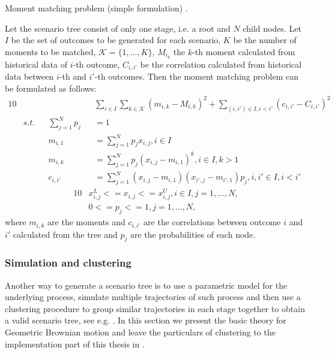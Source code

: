\begin{defn}{Moment matching problem (simple formulation) \cite[p. 9]{moment_matching_agarwal}.}

Let the scenario tree consist of only one stage, i.e. a root and $N$ child nodes. Let $I$ be the set of outcomes to be generated for each scenario, $K$ be the number of moments to be matched, $\mathcal{K}=\{1,\dots,K\}$, $M_{i_k}$ the $k$-th moment calculated from historical data of $i$-th outcome, $C_{i,i'}$ be the correlation calculated from historical data between $i$-th and $i'$-th outcomes. Then the moment matching problem can be formulated as follows:
\begin{alignat}{10}
& && && \sum_{i\in I} \sum_{k\in \mathcal{K}} \left(m_{i,k} - M_{i,k}\right)^2 + \sum_{(i, i') \in I, i < i'}(c_{i,i'}-C_{i,i'})^2 \nonumber \\
& s.t. && \sum_{j=1}^N p_j&&=1 \nonumber \\	
& && m_{i,1}&&=\sum_{j=1}^N p_jx_{i,j}, i \in I \nonumber \\
& && m_{i,k}&&=\sum_{j=1}^N p_j(x_{i,j}-m_{i,1})^k, i \in I, k>1 \nonumber \\
& && c_{i,i'}&&=\sum_{j=1}^N(x_{i,j}-m_{i,1})(x_{i',j}-m_{i',1})p_j, i,i' \in I, i<i' \nonumber
\end{alignat}
\vspace{-0.5cm}
\begin{alignat}{10}
& x_{i,j}^L<=x_{i,j}<=x_{i,j}^U, i \in I, j=1,\dots,N, \nonumber \\
& 0 <= p_j <= 1, j=1,\dots,N, \nonumber
\end{alignat}
where $m_{i,k}$ are the moments and $c_{i,i'}$ are the correlations between outcome $i$ and $i'$ calculated from the tree and $p_j$ are the probabilities of each node.
\end{defn}


\subsubsection{Simulation and clustering}
Another way to generate a scenario tree is to use a parametric model for the underlying process, simulate multiple trajectories of such process and then use a clustering procedure to group similar trajectories in each stage together to obtain a valid scenario tree, see e.g. \cite[Section 3]{dupacova_scenarios_for_multistage_stochastic_programs}. In this section we present the basic theory for Geometric Brownian motion and leave the particulars of clustering to the implementation part of this thesis in .
